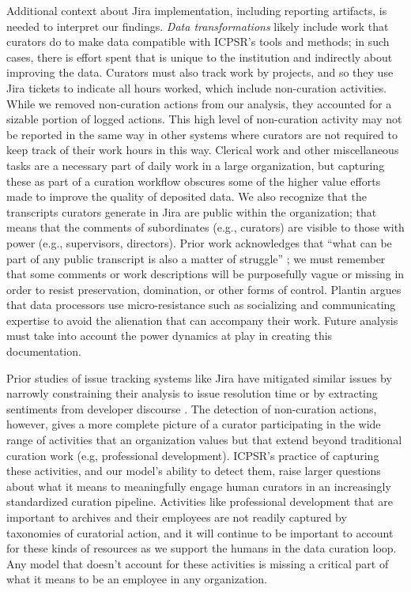 \documentclass[conference]{IEEEtran}
\begin{document}
Additional context about Jira implementation, including reporting artifacts, is needed to interpret our findings. \textit{Data transformations} likely include work that curators do to make data compatible with ICPSR’s tools and methods; in such cases, there is effort spent that is unique to the institution and indirectly about improving the data. Curators must also track work by projects, and so they use Jira tickets to indicate all hours worked, which include non-curation activities. While we removed non-curation actions from our analysis, they accounted for a sizable portion of logged actions. This high level of non-curation activity may not be reported in the same way in other systems where curators are not required to keep track of their work hours in this way. Clerical work and other miscellaneous tasks are a necessary part of daily work in a large organization, but capturing these as part of a curation workflow obscures some of the higher value efforts made to improve the quality of deposited data. We also recognize that the transcripts curators generate in Jira are public within the organization; that means that the comments of subordinates (e.g., curators) are visible to those with power (e.g., supervisors, directors). Prior work acknowledges that “what can be part of any public transcript is also a matter of struggle” \cite{Gal1995-si}; we must remember that some comments or work descriptions will be purposefully vague or missing in order to resist preservation, domination, or other forms of control. Plantin \cite{Plantin2021-hl} argues that data processors use micro-resistance such as socializing and communicating expertise to avoid the alienation that can accompany their work. Future analysis must take into account the power dynamics at play in creating this documentation. 

Prior studies of issue tracking systems like Jira have mitigated similar issues by narrowly constraining their analysis to issue resolution time or by extracting sentiments from developer discourse \cite{Murgia2014-jd, Ortu2015-da}. The detection of non-curation actions, however, gives a more complete picture of a curator participating in the wide range of activities that an organization values but that extend beyond traditional curation work (e.g, professional development). ICPSR’s practice of capturing these activities, and our model’s ability to detect them, raise larger questions about what it means to meaningfully engage human curators in an increasingly standardized curation pipeline. Activities like professional development that are important to archives and their employees are not readily captured by taxonomies of curatorial action, and it will continue to be important to account for these kinds of resources as we support the humans in the data curation loop. Any model that doesn't account for these activities is missing a critical part of what it means to be an employee in any organization.
\end{document}
